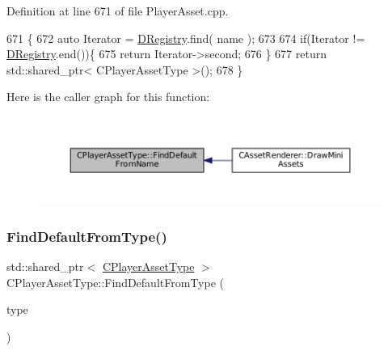 Definition at line 671 of file Player\+Asset.\+cpp.


\begin{DoxyCode}
671                                                                                             \{
672     \textcolor{keyword}{auto} Iterator = \hyperlink{classCPlayerAssetType_a24f4ccd06fbddacc936e31a2f1f12ed5}{DRegistry}.find( name );
673     
674     \textcolor{keywordflow}{if}(Iterator != \hyperlink{classCPlayerAssetType_a24f4ccd06fbddacc936e31a2f1f12ed5}{DRegistry}.end())\{
675         \textcolor{keywordflow}{return} Iterator->second;    
676     \}
677     \textcolor{keywordflow}{return} std::shared\_ptr< CPlayerAssetType >();
678 \}
\end{DoxyCode}
Here is the caller graph for this function\+:\nopagebreak
\begin{figure}[H]
\begin{center}
\leavevmode
\includegraphics[width=350pt]{classCPlayerAssetType_a7e1684eac4efaf7afe9a5c15af262b33_icgraph}
\end{center}
\end{figure}
\hypertarget{classCPlayerAssetType_a7b3c6682f379bfcd974342329eaabab9}{}\label{classCPlayerAssetType_a7b3c6682f379bfcd974342329eaabab9} 
\subsubsection{\texorpdfstring{Find\+Default\+From\+Type()}{FindDefaultFromType()}}
{\footnotesize\ttfamily std\+::shared\+\_\+ptr$<$ \hyperlink{classCPlayerAssetType}{C\+Player\+Asset\+Type} $>$ C\+Player\+Asset\+Type\+::\+Find\+Default\+From\+Type (\begin{DoxyParamCaption}\item[{\hyperlink{GameDataTypes_8h_a5600d4fc433b83300308921974477fec}{E\+Asset\+Type}}]{type }\end{DoxyParamCaption})\hspace{0.3cm}{\ttfamily [static]}}



